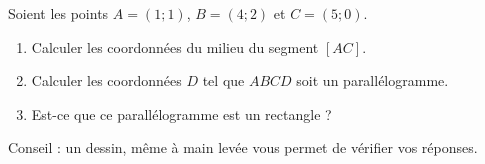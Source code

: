 
\begin{exercice}\label{exosmath-0507}

    Soient les points \( A=(1;1)\), \( B=(4;2)\) et \( C=(5;0)\).
    \begin{enumerate}
        \item
            Calculer les coordonnées du milieu du segment \( [AC]\).
        \item
            Calculer les coordonnées \( D\) tel que \( ABCD\) soit un parallélogramme.
        \item
            Est-ce que ce parallélogramme est un rectangle ?
    \end{enumerate}
    Conseil : un dessin, même à main levée vous permet de vérifier vos réponses.

\end{exercice}
